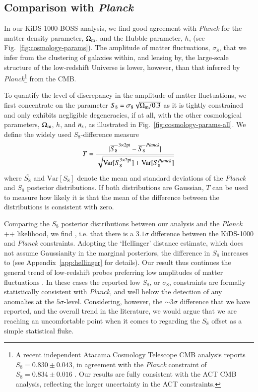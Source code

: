 \subsection{Comparison with {\it Planck}}
\label{sec:planck_comp}
In our KiDS-1000-BOSS \tttp analysis, we find good agreement with {\it Planck} for the matter density parameter, $\Omega_{\rm m}$, and the Hubble parameter, $h$, (see Fig.~\ref{fig:cosmology-params}).
The amplitude of matter fluctuations, $\sigma_8$, that we infer from the clustering of galaxies within, and lensing by, the large-scale structure of the low-redshift Universe is lower, however, than that inferred by {\it Planck}\footnote{A recent independent Atacama Cosmology Telescope CMB analysis reports $S_8=0.830 \pm 0.043$, in agreement with the {\it Planck} constraint of $S_8=0.834 \pm 0.016$ \citep[ACT,][]{aiola/etal:2020}.   Our results are fully consistent with the ACT CMB analysis, reflecting the larger uncertainty in the ACT constraints.} from the CMB. 

To quantify the level of discrepancy in the amplitude of matter fluctuations, we first concentrate on the parameter $S_{8} = \sigma_8 \sqrt{\Omega_{\rm m}/0.3}$ as it is tightly constrained and only exhibits negligible degeneracies, if at all, with the other cosmological parameters, $\Omega_{\rm m}$, $h$, and $n_{\rm s}$, as illustrated in Fig.~\ref{fig:cosmology-params-all}.   We define the widely used $S_8$-difference measure
\begin{equation}
\label{eq: std_tension}
T = \frac{|\overline{S_{8}}^{\,\rm 3\times2pt}-\overline{S_{8}}^{\,\it Planck}|}{\sqrt{\mathrm{Var}[S_{8}^{\rm 3\times2pt}] + \mathrm{Var}[S_{8}^{\it Planck}]}}
\end{equation}
where $\overline{S_{8}}$ and $\mathrm{Var}[S_{8}] $ denote the mean and standard deviations of the {\it Planck} and \tttp $S_8$ posterior distributions.  If both distributions are Gaussian, $T$ can be used to measure how likely it is that the mean of the difference between the distributions is consistent with zero.

Comparing the $S_{8}$ posterior distributions between our \tttp analysis and the {\it Planck} ++ likelihood, we find , i.e. that there is a $3.1\sigma$ difference between the KiDS-1000 and {\it Planck} constraints.   Adopting the `Hellinger' distance estimate, which does not assume Gaussianity in the marginal posteriors, the difference in $S_8$ increases to  (see Appendix~\ref{app:hellinger} for details).  Our result thus continues the general trend of low-redshift probes preferring low amplitudes of matter fluctuations \citep{heymans/etal:2013, alam/etal:2017, abbott/etal:2018, hikage/etal:2019, bocquet/etal:2019, wright/etal:2020b,DESclusters/etal:2020}. 
In these cases the reported low $S_8$, or $\sigma_8$, constraints are formally statistically consistent with {\it Planck}, and well below the detection of any anomalies at the $5\sigma$-level. 
Considering, however, the $\sim 3\sigma$ difference that we have reported, and the overall trend in the literature, we would argue that we are reaching an uncomfortable point when it comes to regarding the $S_8$ offset as a simple statistical fluke.

